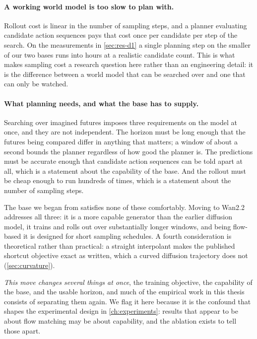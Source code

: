 \paragraph{A working world model is too slow to plan with.} Rollout cost is
linear in the number of sampling steps, and a planner evaluating candidate
action sequences pays that cost once per candidate per step of the search.
On the measurements in \cref{sec:res-d1} a single planning step on the
smaller of our two bases runs into hours at a realistic candidate count.
This is what makes sampling cost a research question here rather than an
engineering detail: it is the difference between a world model that can be
searched over and one that can only be watched.

\paragraph{What planning needs, and what the base has to supply.} Searching
over imagined futures imposes three requirements on the model at once, and
they are not independent. The horizon must be long enough that the futures
being compared differ in anything that matters; a window of about a second
bounds the planner regardless of how good the planner is. The predictions
must be accurate enough that candidate action sequences can be told apart at
all, which is a statement about the capability of the base. And the rollout
must be cheap enough to run hundreds of times, which is a statement about
the number of sampling steps.

The base we began from satisfies none of these comfortably. Moving to
Wan2.2 addresses all three: it is a more capable generator than the earlier
diffusion model, it trains and rolls out over substantially longer windows,
and being flow-based it is designed for short sampling schedules. A fourth
consideration is theoretical rather than practical: a straight interpolant
makes the published shortcut objective exact as written, which a curved
diffusion trajectory does not (\cref{sec:curvature}).

\emph{This move changes several things at once}, the training objective, the
capability of the base, and the usable horizon, and much of the empirical
work in this thesis consists of separating them again. We flag it here
because it is the confound that shapes the experimental design in
\cref{ch:experiments}: results that appear to be about flow matching may be
about capability, and the ablation exists to tell those apart.

